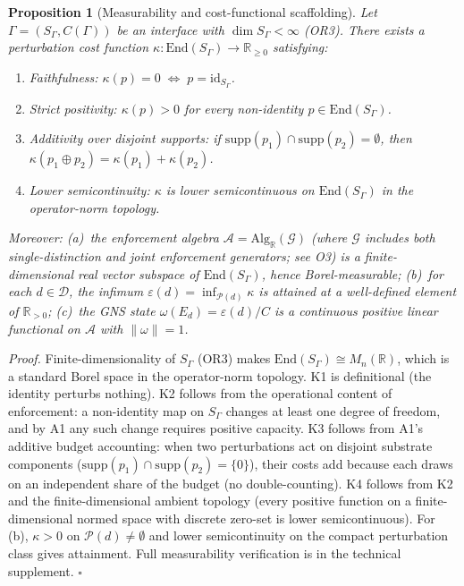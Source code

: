 \documentclass[11pt]{article}
\newtheorem{proposition}[theorem]{Proposition}
\theoremstyle{remark}
\begin{document}
\begin{proposition}[Measurability and cost-functional scaffolding]\label{prop:meas}
Let $\Gamma = (S_\Gamma, C(\Gamma))$ be an interface with $\dim S_\Gamma < \infty$ (OR3).  There exists a perturbation cost function $\kappa: \mathrm{End}(S_\Gamma) \to \mathbb{R}_{\ge 0}$ satisfying:
\begin{enumerate}[label=\textup{(K\arabic*)}]
\item \textit{Faithfulness:} $\kappa(p) = 0 \;\Leftrightarrow\; p = \mathrm{id}_{S_\Gamma}$.
\item \textit{Strict positivity:} $\kappa(p) > 0$ for every non-identity $p \in \mathrm{End}(S_\Gamma)$.
\item \textit{Additivity over disjoint supports:} if $\mathrm{supp}(p_1) \cap \mathrm{supp}(p_2) = \emptyset$, then $\kappa(p_1 \oplus p_2) = \kappa(p_1) + \kappa(p_2)$.
\item \textit{Lower semicontinuity:} $\kappa$ is lower semicontinuous on $\mathrm{End}(S_\Gamma)$ in the operator-norm topology.
\end{enumerate}
Moreover: (a)~the enforcement algebra $\mathcal{A} = \mathrm{Alg}_\mathbb{R}(\mathcal{G})$ (where $\mathcal{G}$ includes both single-distinction and joint enforcement generators; see O3) is a finite-dimensional real vector subspace of $\mathrm{End}(S_\Gamma)$, hence Borel-measurable; (b)~for each $d \in \mathcal{D}$, the infimum $\varepsilon(d) = \inf_{\mathcal{P}(d)} \kappa$ is attained at a well-defined element of $\mathbb{R}_{>0}$; (c)~the GNS state $\omega(E_d) = \varepsilon(d)/C$ is a continuous positive linear functional on $\mathcal{A}$ with $\|\omega\| = 1$.
\end{proposition}

\smallskip\noindent\textit{Proof.}  Finite-dimensionality of $S_\Gamma$ (OR3) makes $\mathrm{End}(S_\Gamma) \cong M_n(\mathbb{R})$, which is a standard Borel space in the operator-norm topology.  K1 is definitional (the identity perturbs nothing).  K2 follows from the operational content of enforcement: a non-identity map on $S_\Gamma$ changes at least one degree of freedom, and by A1 any such change requires positive capacity.  K3 follows from A1's additive budget accounting: when two perturbations act on disjoint substrate components ($\mathrm{supp}(p_1) \cap \mathrm{supp}(p_2) = \{0\}$), their costs add because each draws on an independent share of the budget (no double-counting).  K4 follows from K2 and the finite-dimensional ambient topology (every positive function on a finite-dimensional normed space with discrete zero-set is lower semicontinuous).  For (b), $\kappa > 0$ on $\mathcal{P}(d) \neq \emptyset$ and lower semicontinuity on the compact perturbation class gives attainment.  Full measurability verification is in the technical supplement.  \hfill$\square$
\end{document}
